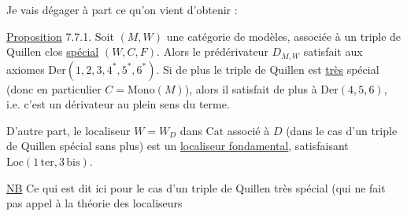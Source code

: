 Je vais dégager à part ce qu'on vient d'obtenir :

\uline{Proposition} 7.7.1. Soit $(M,W)$ une catégorie de modèles, associée à un triple de Quillen clos \uline{spécial} $(W,C,F)$. Alors le prédérivateur  $D_{M,W}$  satisfait aux axiomes $\mathrm{Der}(1,2,3,4^*,5^*,6^*)$. Si de plus le triple de Quillen est \uline{très} spécial (donc en particulier $C=\mathrm{Mono}(M)$), alors il satisfait de plus à $\mathrm{Der}(4,5,6)$, i.e. c'est un dérivateur au plein sens du terme.

D'autre part, le localiseur $W=W_D$ dans $\mathrm{Cat}$ associé à $D$ (dans le cas d'un triple de Quillen spécial sans plus)  est un \uline{localiseur fondamental}, satisfaisant   $\mathrm{Loc}(1\,\mathrm{ter},3\,\mathrm{bis})$.

\uline{NB} Ce qui est dit ici pour le cas d'un triple de Quillen très spécial (qui ne fait pas appel à la théorie des localiseurs
